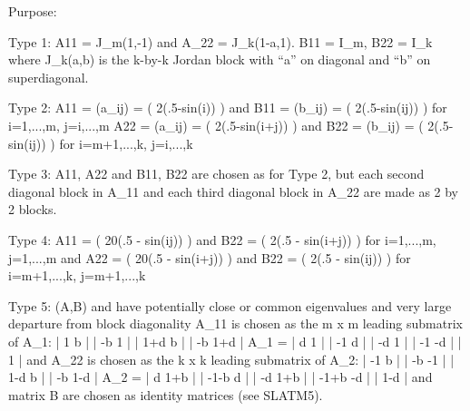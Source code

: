 \begin{DoxyParagraph}{Purpose\+: }
\begin{DoxyVerb}
 Type 1:  A11 = J_m(1,-1) and A_22 = J_k(1-a,1).
          B11 = I_m, B22 = I_k
          where J_k(a,b) is the k-by-k Jordan block with ``a'' on
          diagonal and ``b'' on superdiagonal.

 Type 2:  A11 = (a_ij) = ( 2(.5-sin(i)) ) and
          B11 = (b_ij) = ( 2(.5-sin(ij)) ) for i=1,...,m, j=i,...,m
          A22 = (a_ij) = ( 2(.5-sin(i+j)) ) and
          B22 = (b_ij) = ( 2(.5-sin(ij)) ) for i=m+1,...,k, j=i,...,k

 Type 3:  A11, A22 and B11, B22 are chosen as for Type 2, but each
          second diagonal block in A_11 and each third diagonal block
          in A_22 are made as 2 by 2 blocks.

 Type 4:  A11 = ( 20(.5 - sin(ij)) ) and B22 = ( 2(.5 - sin(i+j)) )
             for i=1,...,m,  j=1,...,m and
          A22 = ( 20(.5 - sin(i+j)) ) and B22 = ( 2(.5 - sin(ij)) )
             for i=m+1,...,k,  j=m+1,...,k

 Type 5:  (A,B) and have potentially close or common eigenvalues and
          very large departure from block diagonality A_11 is chosen
          as the m x m leading submatrix of A_1:
                  |  1  b                            |
                  | -b  1                            |
                  |        1+d  b                    |
                  |         -b 1+d                   |
           A_1 =  |                  d  1            |
                  |                 -1  d            |
                  |                        -d  1     |
                  |                        -1 -d     |
                  |                               1  |
          and A_22 is chosen as the k x k leading submatrix of A_2:
                  | -1  b                            |
                  | -b -1                            |
                  |       1-d  b                     |
                  |       -b  1-d                    |
           A_2 =  |                 d 1+b            |
                  |               -1-b d             |
                  |                       -d  1+b    |
                  |                      -1+b  -d    |
                  |                              1-d |
          and matrix B are chosen as identity matrices (see SLATM5).\end{DoxyVerb}
 
\end{DoxyParagraph}

